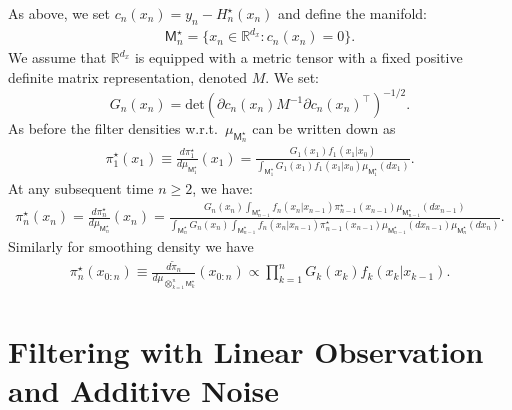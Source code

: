 \documentclass[english,13pt]{article}
\numberwithin{equation}{section}
\begin{document}
As above, we set $c_n(x_n) = y_n-H_n^{\star}(x_n)$ and define the manifold:
%
\begin{align}
\label{eq:M-general-zero}
 \mathsf{M}_n^{\star}=\{x_n\in\mathbb{R}^{d_x}:
c_n(x_n) = 0\}.
\end{align}
%
We assume that $\mathbb{R}^{d_x}$ is equipped with a metric tensor with a fixed positive definite matrix representation, denoted $M$.  We set:
%
\begin{equation}
\label{eq:Gram}
G_n(x_n) = \textrm{det}(\partial c_n(x_n)M^{-1}\partial c_n(x_n)^{\top})^{-1/2}.
\end{equation}
%
As before the filter densities w.r.t.~$\mu_{\mathsf{M}_n^{\star}}$ can be written down as
%
\begin{align*}
\pi_1^{\star}(x_1) \equiv 
\frac{d\pi_1^{\star}}{d\mu_{\mathsf{M}_{1}^{\star}}}(x_1) = \frac{
G_1(x_1)f_1(x_1|x_0)}{
\int_{\mathsf{M}_1^{\star}}
G_1(x_1)f_1(x_1|x_0)
\mu_{\mathsf{M}_1^{\star}}(dx_1)
}.
\end{align*}
%
At any subsequent time $n\geq 2$, we have: 
%
\begin{align*}
\pi_n^{\star}(x_n) = \frac{d\pi_n^{\star}}{d\mu_{\mathsf{M}_{n}^{\star}}}(x_n) =   \frac{
G_n(x_n) \int_{\mathsf{M}_{n-1}^{\star} } f_{n}(x_n|x_{n-1})
\pi_{n-1}^{\star}(x_{n-1}) \mu_{\mathsf{M}_{n-1}^{\star}}(dx_{n-1})
}{
\int_{\mathsf{M}_n^{\star}}
G_n(x_n)\int_{\mathsf{M}_{n-1}^{\star} } f_n(x_n|x_{n-1})
\pi_{n-1}^{\star}(x_{n-1}) \mu_{\mathsf{M}_{n-1}^{\star}}(dx_{n-1})
\mu_{\mathsf{M}_n^{\star}}(dx_n)
}.
\end{align*}
Similarly for smoothing density we have
\begin{align}
{\pi}_n^{\star}(x_{0:n}) \equiv \frac{d\widetilde{\pi}_n}{d\mu_{\bigotimes_{k=1}^n \mathsf{M}^{\star}_k}}(x_{0:n})    \propto 
\prod_{k=1}^n {G}_k(x_k) f_k(x_k|x_{k-1}).
\label{eq:smoothing_M_n_degenerate}
\end{align}


\section{Filtering with Linear Observation and  Additive Noise}\label{sec:case_study}
\end{document}
